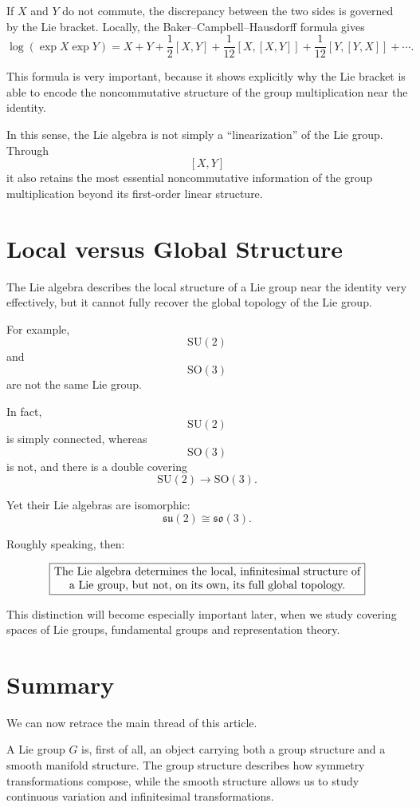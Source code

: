 \documentclass[11pt]{article}
\begin{document}
If $X$ and $Y$ do not commute, the discrepancy between the two sides is governed by the Lie bracket. Locally, the Baker--Campbell--Hausdorff formula gives
\[
\log(\exp X\exp Y)
=
X+Y
+
\frac12[X,Y]
+
\frac1{12}[X,[X,Y]]
+
\frac1{12}[Y,[Y,X]]
+\cdots.
\]

This formula is very important, because it shows explicitly why the Lie bracket is able to encode the noncommutative structure of the group multiplication near the identity.

In this sense, the Lie algebra is not simply a ``linearization'' of the Lie group. Through
\[
[X,Y]
\]
it also retains the most essential noncommutative information of the group multiplication beyond its first-order linear structure.


\section{Local versus Global Structure}

The Lie algebra describes the local structure of a Lie group near the identity very effectively, but it cannot fully recover the global topology of the Lie group.

For example,
\[
\mathrm{SU}(2)
\]
and
\[
\mathrm{SO}(3)
\]
are not the same Lie group.

In fact,
\[
\mathrm{SU}(2)
\]
is simply connected, whereas
\[
\mathrm{SO}(3)
\]
is not, and there is a double covering
\[
\mathrm{SU}(2)\longrightarrow\mathrm{SO}(3).
\]

Yet their Lie algebras are isomorphic:
\[
\mathfrak{su}(2)
\cong
\mathfrak{so}(3).
\]

Roughly speaking, then:

\[
\boxed{
\parbox{0.8\linewidth}{\centering
The Lie algebra determines the local, infinitesimal structure of a Lie group,
but not, on its own, its full global topology.}
}
\]

This distinction will become especially important later, when we study covering spaces of Lie groups, fundamental groups and representation theory.


\section{Summary}

We can now retrace the main thread of this article.

A Lie group $G$ is, first of all, an object carrying both a group structure and a smooth manifold structure. The group structure describes how symmetry transformations compose, while the smooth structure allows us to study continuous variation and infinitesimal transformations.
\end{document}
